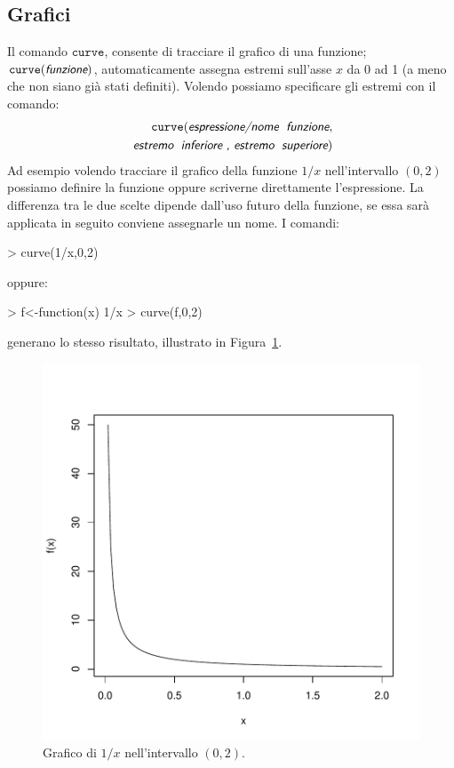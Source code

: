 \documentclass[onecolumn,11pt]{book}
\newcommand{\varia}[1]{\textsl{\textsf{#1}}}
\begin{document}
\subsection{Grafici}
Il comando $\texttt{curve}$, consente di tracciare il grafico di una funzione; $\texttt{curve}({\varia{funzione}})$, automaticamente assegna estremi sull'asse $x$ da 0 ad 1 (a meno che non siano gi\`a stati definiti). %
Volendo possiamo specificare gli estremi con il comando: %
\begin{eqnarray*}\texttt{curve}(\varia{espressione/nome\; funzione},\\
\varia{ estremo\; inferiore , estremo \;superiore})\end{eqnarray*}
Ad esempio volendo tracciare il grafico della funzione $1/x$ nell'intervallo $(0,2)$ possiamo definire la funzione oppure scriverne direttamente l'espressione. %
La differenza tra le due scelte dipende dall'uso futuro della funzione, se essa sar\`a applicata in seguito conviene assegnarle un nome. 
I comandi:
\begin{Schunk}
\begin{Sinput}
> curve(1/x,0,2)
\end{Sinput}
\end{Schunk}
oppure:
\begin{Schunk}
\begin{Sinput}
> f<-function(x) 1/x
> curve(f,0,2)
\end{Sinput}
\end{Schunk}
generano  lo stesso risultato, illustrato in Figura~\ref{grafounox}.\vskip5pt
\begin{figure}[htbp]
\begin{center}
\includegraphics{statisticaconR-054}
\caption{Grafico di $1/x$ nell'intervallo $(0,2)$.}
\label{grafounox}
\end{center}
\end{figure}
\end{document}
